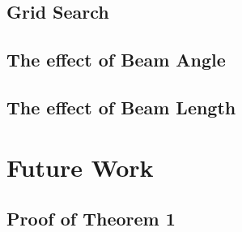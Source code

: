 \documentclass[conference]{IEEEtran}
\begin{document}
  \subsection{Grid Search}

  \subsection{The effect of Beam Angle}

  \subsection{The effect of Beam Length}

\section{Future Work}





\onecolumn
\appendix

\subsection{Proof of Theorem 1} \label{thm:1}
\end{document}
